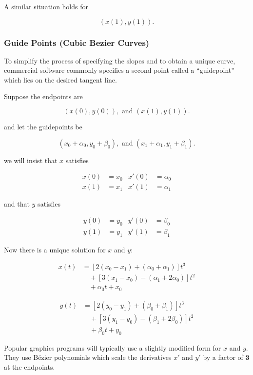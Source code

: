 \documentclass[12pt]{article}
\begin{document}
A similar situation holds for 

\[
  (x(1), y(1))
.\]

\subsubsection{Guide Points (Cubic Bezier Curves)}
To simplify the process of specifying the slopes and to obtain a unique curve,
commercial software commonly specifies a second point called a
\enquote{guidepoint} which lies on the desired tangent line.

Suppose the endpoints are

\[
  (x(0), y(0)), \text{ and } (x(1), y(1))
.\]

and let the guidepoints be

\[
  (x_0 + \alpha_0, y_0 + \beta_0), \text{ and } (x_1 + \alpha_1, y_1 + \beta_1)
.\]

we will insist that $x$ satisfies

\begin{align*}
  x(0) &= x_0 & x'(0) &= \alpha_0 \\
  x(1) &= x_1 & x'(1) &= \alpha_1
\end{align*}

and that $y$ satisfies

\begin{align*}
  y(0) &= y_0 & y'(0) &= \beta_0 \\
  y(1) &= y_1 & y'(1) &= \beta_1
\end{align*}

Now there is a unique solution for $x$ and $y$:

\begin{align*}
    x(t) &= \left[ 2(x_0 - x_1) + (\alpha_0 + \alpha_1) \right] t^3 \\
         &\quad + \left[ 3(x_1 - x_0) - (\alpha_1 + 2\alpha_0) \right] t^2 \\
         &\quad + \alpha_0 t + x_0
\end{align*}

\begin{align*}
    y(t) &= \left[ 2(y_0 - y_1) + (\beta_0 + \beta_1) \right] t^3 \\
         &\quad + \left[ 3(y_1 - y_0) - (\beta_1 + 2\beta_0) \right] t^2 \\
         &\quad + \beta_0 t + y_0
\end{align*}

Popular graphics programs will typically use a slightly modified form for $x$
and $y$. They use B\'ezier polynomials which scale the derivatives $x'$ and $y'$
by a factor of $\mathbf{3}$ at the endpoints.
\end{document}
